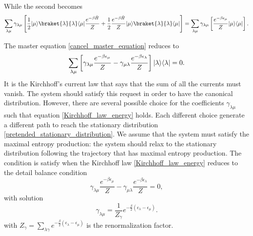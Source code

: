 While the second becomes
\begin{equation}
    \sum_{\lambda\mu} \gamma_{\lambda\mu}\left[\frac{1}{2}\ket{\mu}\braket{\lambda}{\lambda}\bra{\mu}\frac{e^{-\beta\hat H}}{Z} +\frac{1}{2}\frac{e^{-\beta\hat H}}{Z}\ket{\mu}\braket{\lambda}{\lambda}\bra{\mu}\right]= \sum_{\lambda\mu} \gamma_{\lambda\mu}\left[\frac{e^{-\beta \epsilon_\mu}}{Z}\ket{\mu}\bra{\mu}\right].
\end{equation}

The master equation \eqref{cancel_master_equation} reduces to 
\begin{equation}\label{Kirchhoff_law_energy}
    \sum_{\lambda\mu}\left[\gamma_{\lambda\mu}\frac{e^{-\beta \epsilon_\mu}}{Z} - \gamma_{\mu\lambda}\frac{e^{-\beta \epsilon_\lambda}}{Z}\right]\lvert\lambda\rangle\langle\lambda\rvert = 0.
\end{equation}
It is the Kirchhoff's current law that says that the sum of all the currents must vanish. The system should satisfy this request in order to have the canonical distribution.
However, there are several possible choice for the coefficients $\gamma_{\lambda\mu}$ such that equation \eqref{Kirchhoff_law_energy} holds.
Each different choice generate a different path to reach the stationary distribution \eqref{pretended_stationary_distribution}. We assume that the system must satisfy the maximal entropy production: the system should relax to the stationary distribution following the trajectory that has maximal entropy production. The condition is satisfy when the Kirchhoff law \eqref{Kirchhoff_law_energy} reduces to the detail balance condition
\begin{equation}
    \gamma_{\lambda\mu}\frac{e^{-\beta \epsilon_\mu}}{Z} - \gamma_{\mu\lambda}\frac{e^{-\beta \epsilon_\lambda}}{Z} = 0,
\end{equation}
with solution
\begin{equation}\label{gamma_detailed_balance}
    \gamma_{\lambda\mu} = \frac{1}{Z_\gamma}e^{-\frac{\beta}{2}\left(\epsilon_\lambda - \epsilon_\mu\right)}.
\end{equation}
with $Z_\gamma = \sum_{\lambda\gamma}e^{-\frac{\beta}{2}\left(\epsilon_\lambda - \epsilon_\mu\right)}$ is the renormalization factor.

